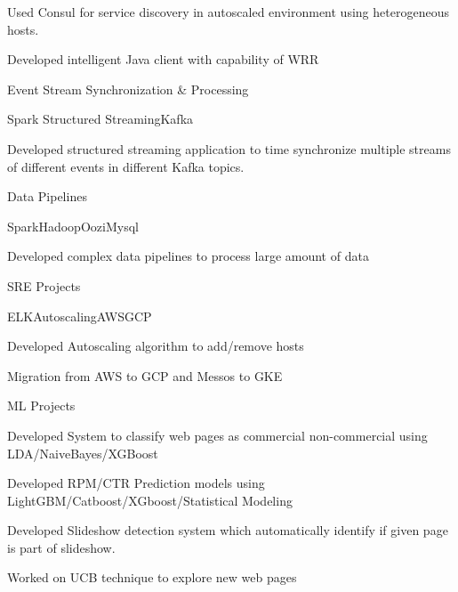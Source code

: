 \documentclass[8pt,a4paper]{article}
\begin{document}
\begin{multicols}{2}
\begin{desc}{Used Consul for service discovery in autoscaled environment using heterogeneous hosts. }
\end{desc}
\begin{desc}{Developed intelligent Java client with capability of WRR}
\end{desc}
\begin{expsec}{Event Stream Synchronization \& Processing}
\end{expsec}
\begin{expsubsec}{Spark Structured Streaming{\textbar}Kafka}
\end{expsubsec}
\begin{desc}{Developed structured streaming application to time synchronize multiple streams of different events in different Kafka topics.}
\end{desc}
\begin{expsec}{Data Pipelines}
\end{expsec}
\begin{expsubsec}{Spark{\textbar}Hadoop{\textbar}Oozi{\textbar}Mysql}
\end{expsubsec}
\begin{desc}{Developed complex data pipelines to process large amount of data}
\end{desc}
\begin{expsec}{SRE Projects}
\end{expsec}
\begin{expsubsec}{ELK{\textbar}Autoscaling{\textbar}AWS{\textbar}GCP}
\end{expsubsec}
\begin{desc}{Developed Autoscaling algorithm to add/remove hosts}
\end{desc}
\begin{desc}{Migration from AWS to GCP and Messos to GKE}
\end{desc}
\begin{expsec}{ML Projects}
\end{expsec}
\begin{desc}{Developed System to classify web pages as commercial non-commercial using LDA/NaiveBayes/XGBoost}
\end{desc}
\begin{desc}{Developed RPM/CTR Prediction models using LightGBM/Catboost/XGboost/Statistical Modeling}
\end{desc}
\begin{desc}{Developed Slideshow detection system which automatically identify if given page is part of slideshow.}
\end{desc}
\begin{desc}{Worked on UCB technique to explore new web pages}

\end{desc}
\end{multicols}
\end{document}
